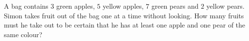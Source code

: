 A bag contains $3$ green apples, $5$ yellow apples, $7$ green pears and $2$ yellow pears. Simon takes fruit out of the bag one at a time without looking. How many fruits must he take out to be certain that he has at least one apple and one pear of the same colour?
